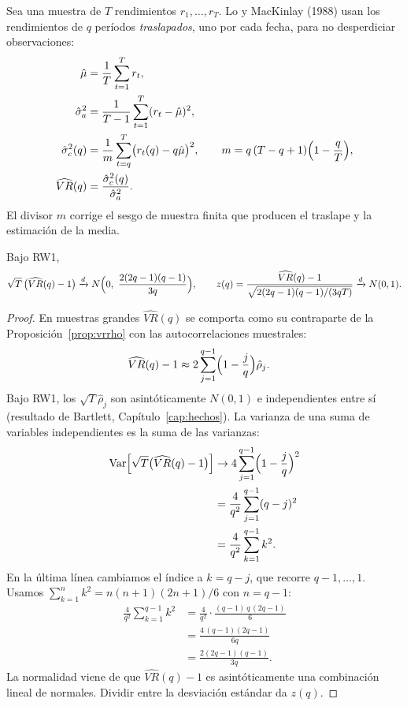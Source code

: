 Sea una muestra de $T$ rendimientos $r_1,\dots,r_T$. Lo y MacKinlay (1988) usan los rendimientos de $q$
períodos \emph{traslapados}, uno por cada fecha, para no desperdiciar observaciones:
\begin{align*}
  \hat\mu &= \frac1T\sum_{t=1}^{T}r_t,\\
  \hat\sigma_a^2 &= \frac1{T-1}\sum_{t=1}^{T}(r_t-\hat\mu)^2,\\
  \hat\sigma_c^2(q) &= \frac1m\sum_{t=q}^{T}\bigl(r_t(q)-q\hat\mu\bigr)^2,
       \qquad m=q\,(T-q+1)\Bigl(1-\frac qT\Bigr),\\
  \widehat{VR}(q) &= \frac{\hat\sigma_c^2(q)}{\hat\sigma_a^2}.
\end{align*}
El divisor $m$ corrige el sesgo de muestra finita que producen el traslape y la estimación de la media.

\begin{proposicion}\label{prop:vrasint}
Bajo RW1,
\[
  \sqrt T\,\bigl(\widehat{VR}(q)-1\bigr)\xrightarrow{d}N\Bigl(0,\ \frac{2(2q-1)(q-1)}{3q}\Bigr),
  \qquad
  z(q)=\frac{\widehat{VR}(q)-1}{\sqrt{2(2q-1)(q-1)/(3qT)}}\xrightarrow{d}N(0,1).
\]
\end{proposicion}

\begin{proof}
En muestras grandes $\widehat{VR}(q)$ se comporta como su contraparte de la Proposición~\ref{prop:vrrho} con
las autocorrelaciones muestrales:
\begin{align*}
  \widehat{VR}(q)-1 &\approx 2\sum_{j=1}^{q-1}\Bigl(1-\frac jq\Bigr)\hat\rho_j .
\end{align*}
Bajo RW1, los $\sqrt T\hat\rho_j$ son asintóticamente $N(0,1)$ e independientes entre sí (resultado de
Bartlett, Capítulo~\ref{cap:hechos}). La varianza de una suma de variables independientes es la suma de las
varianzas:
\begin{align*}
  \operatorname{Var}\Bigl[\sqrt T\bigl(\widehat{VR}(q)-1\bigr)\Bigr]
    &\to 4\sum_{j=1}^{q-1}\Bigl(1-\frac jq\Bigr)^2\\
    &= \frac4{q^2}\sum_{j=1}^{q-1}(q-j)^2\\
    &= \frac4{q^2}\sum_{k=1}^{q-1}k^2 .
\end{align*}
En la última línea cambiamos el índice a $k=q-j$, que recorre $q-1,\dots,1$. Usamos
$\sum_{k=1}^{n}k^2=n(n+1)(2n+1)/6$ con $n=q-1$:
\begin{align*}
  \frac4{q^2}\sum_{k=1}^{q-1}k^2 &= \frac4{q^2}\cdot\frac{(q-1)\,q\,(2q-1)}{6}\\
                                 &= \frac{4\,(q-1)(2q-1)}{6q}\\
                                 &= \frac{2(2q-1)(q-1)}{3q}.
\end{align*}
La normalidad viene de que $\widehat{VR}(q)-1$ es asintóticamente una combinación lineal de normales. Dividir
entre la desviación estándar da $z(q)$.
\end{proof}

